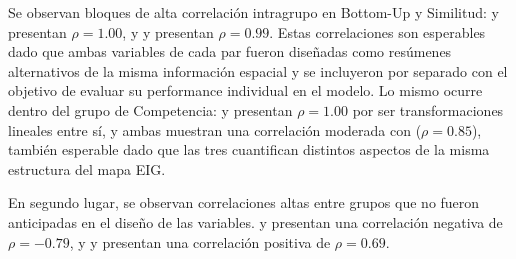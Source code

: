 \begin{sloppypar}
Se observan bloques de alta correlación
intragrupo en Bottom-Up y Similitud:  y
 presentan $\rho = 1.00$, y
 y  presentan
$\rho = 0.99$. Estas correlaciones son esperables dado que ambas
variables de cada par fueron diseñadas como resúmenes alternativos
de la misma información espacial y se incluyeron por separado
con el objetivo de evaluar su performance individual en el modelo.
Lo mismo ocurre dentro del grupo de Competencia:
 y 
presentan $\rho = 1.00$ por ser transformaciones lineales entre sí,
y ambas muestran una correlación moderada con
 ($\rho = 0.85$), también esperable dado
que las tres cuantifican distintos aspectos de la misma estructura
del mapa EIG.
\end{sloppypar}

En segundo lugar, se observan correlaciones altas entre grupos que 
no fueron anticipadas en el diseño de las variables. 
 y  presentan 
una correlación negativa de $\rho = -0.79$, y 
 y  presentan 
una correlación positiva de $\rho = 0.69$. 

